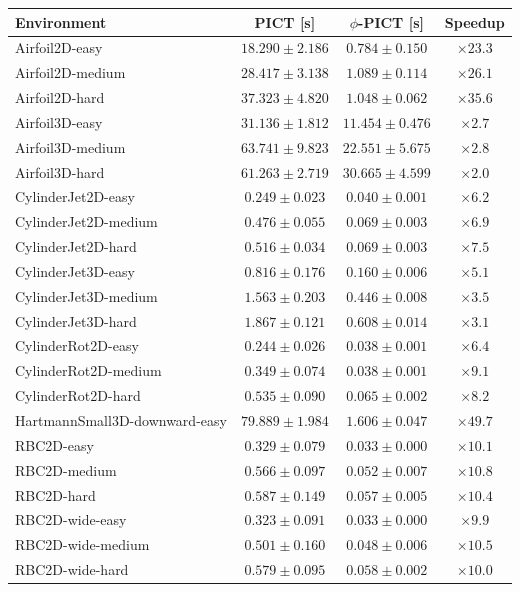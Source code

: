 \begin{tabular}{lccc}
\toprule
Environment & PICT [s] & $\phi$-PICT [s] & Speedup \\
\midrule
Airfoil2D-easy & $18.290 \pm 2.186$ & $0.784 \pm 0.150$ & $\times23.3$ \\
Airfoil2D-medium & $28.417 \pm 3.138$ & $1.089 \pm 0.114$ & $\times26.1$ \\
Airfoil2D-hard & $37.323 \pm 4.820$ & $1.048 \pm 0.062$ & $\times35.6$ \\
Airfoil3D-easy & $31.136 \pm 1.812$ & $11.454 \pm 0.476$ & $\times2.7$ \\
Airfoil3D-medium & $63.741 \pm 9.823$ & $22.551 \pm 5.675$ & $\times2.8$ \\
Airfoil3D-hard & $61.263 \pm 2.719$ & $30.665 \pm 4.599$ & $\times2.0$ \\
CylinderJet2D-easy & $0.249 \pm 0.023$ & $0.040 \pm 0.001$ & $\times6.2$ \\
CylinderJet2D-medium & $0.476 \pm 0.055$ & $0.069 \pm 0.003$ & $\times6.9$ \\
CylinderJet2D-hard & $0.516 \pm 0.034$ & $0.069 \pm 0.003$ & $\times7.5$ \\
CylinderJet3D-easy & $0.816 \pm 0.176$ & $0.160 \pm 0.006$ & $\times5.1$ \\
CylinderJet3D-medium & $1.563 \pm 0.203$ & $0.446 \pm 0.008$ & $\times3.5$ \\
CylinderJet3D-hard & $1.867 \pm 0.121$ & $0.608 \pm 0.014$ & $\times3.1$ \\
CylinderRot2D-easy & $0.244 \pm 0.026$ & $0.038 \pm 0.001$ & $\times6.4$ \\
CylinderRot2D-medium & $0.349 \pm 0.074$ & $0.038 \pm 0.001$ & $\times9.1$ \\
CylinderRot2D-hard & $0.535 \pm 0.090$ & $0.065 \pm 0.002$ & $\times8.2$ \\
HartmannSmall3D-downward-easy & $79.889 \pm 1.984$ & $1.606 \pm 0.047$ & $\times49.7$ \\
RBC2D-easy & $0.329 \pm 0.079$ & $0.033 \pm 0.000$ & $\times10.1$ \\
RBC2D-medium & $0.566 \pm 0.097$ & $0.052 \pm 0.007$ & $\times10.8$ \\
RBC2D-hard & $0.587 \pm 0.149$ & $0.057 \pm 0.005$ & $\times10.4$ \\
RBC2D-wide-easy & $0.323 \pm 0.091$ & $0.033 \pm 0.000$ & $\times9.9$ \\
RBC2D-wide-medium & $0.501 \pm 0.160$ & $0.048 \pm 0.006$ & $\times10.5$ \\
RBC2D-wide-hard & $0.579 \pm 0.095$ & $0.058 \pm 0.002$ & $\times10.0$ \\

\end{tabular}
